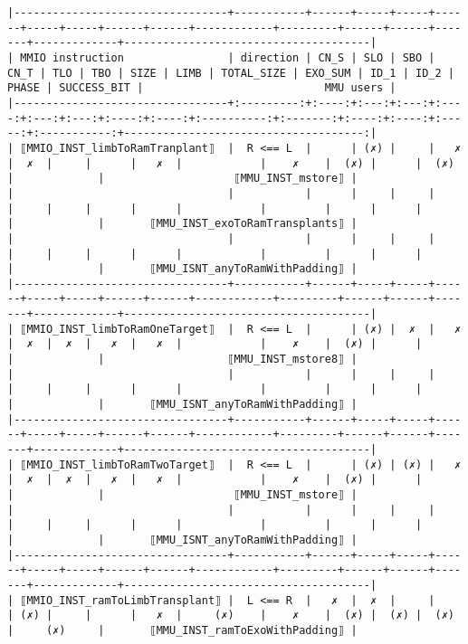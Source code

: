 \documentclass[varwidth=\maxdimen,margin=0.5cm,multi={verbatim}]{standalone}
\begin{document}
\begin{verbatim}
|---------------------------------+-----------+------+-----+-----+------+-----+-----+------+------+------------+---------+------+------+-------+-------------+--------------------------------------|
| MMIO instruction                | direction | CN_S | SLO | SBO | CN_T | TLO | TBO | SIZE | LIMB | TOTAL_SIZE | EXO_SUM | ID_1 | ID_2 | PHASE | SUCCESS_BIT |                            MMU users |
|---------------------------------+:---------:+:----:+:---:+:---:+:----:+:---:+:---:+:----:+:----:+:----------:+:-------:+:----:+:----:+:-----:+:-----------:+-------------------------------------:|
| ⟦MMIO_INST_limbToRamTranplant⟧  |  R <== L  |      | (✗) |     |   ✗  |  ✗  |     |      |   ✗  |            |    ✗    |  (✗) |      |  (✗)  |             |                    ⟦MMU_INST_mstore⟧ |
|                                 |           |      |     |     |      |     |     |      |      |            |         |      |      |       |             |       ⟦MMU_INST_exoToRamTransplants⟧ |
|                                 |           |      |     |     |      |     |     |      |      |            |         |      |      |       |             |       ⟦MMU_ISNT_anyToRamWithPadding⟧ |
|---------------------------------+-----------+------+-----+-----+------+-----+-----+------+------+------------+---------+------+------+-------+-------------+--------------------------------------|
| ⟦MMIO_INST_limbToRamOneTarget⟧  |  R <== L  |      | (✗) |  ✗  |   ✗  |  ✗  |  ✗  |   ✗  |   ✗  |            |    ✗    |  (✗) |      |       |             |                   ⟦MMU_INST_mstore8⟧ |
|                                 |           |      |     |     |      |     |     |      |      |            |         |      |      |       |             |       ⟦MMU_ISNT_anyToRamWithPadding⟧ |
|---------------------------------+-----------+------+-----+-----+------+-----+-----+------+------+------------+---------+------+------+-------+-------------+--------------------------------------|
| ⟦MMIO_INST_limbToRamTwoTarget⟧  |  R <== L  |      | (✗) | (✗) |   ✗  |  ✗  |  ✗  |   ✗  |   ✗  |            |    ✗    |  (✗) |      |       |             |                    ⟦MMU_INST_mstore⟧ |
|                                 |           |      |     |     |      |     |     |      |      |            |         |      |      |       |             |       ⟦MMU_ISNT_anyToRamWithPadding⟧ |
|---------------------------------+-----------+------+-----+-----+------+-----+-----+------+------+------------+---------+------+------+-------+-------------+--------------------------------------|
| ⟦MMIO_INST_ramToLimbTransplant⟧ |  L <== R  |   ✗  |  ✗  |     |      | (✗) |     |      |   ✗  |     (✗)    |    ✗    |  (✗) |  (✗) |  (✗)  |     (✗)     |       ⟦MMU_INST_ramToExoWithPadding⟧ |

\end{verbatim}
\end{document}
